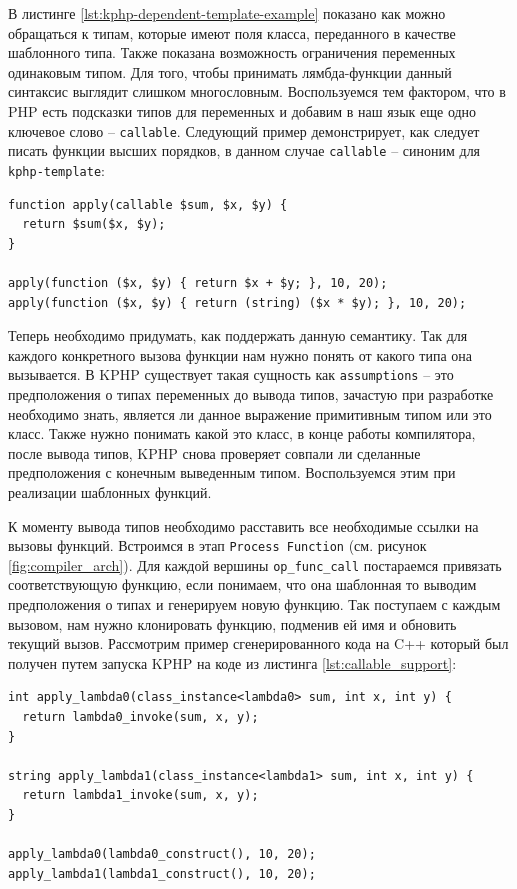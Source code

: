 В листинге \ref{lst:kphp-dependent-template-example} показано как можно обращаться к типам, которые имеют поля класса, переданного в качестве шаблонного типа.
Также показана возможность ограничения переменных одинаковым типом.
Для того, чтобы принимать лямбда-функции данный синтаксис выглядит слишком многословным.
Воспользуемся тем фактором, что в PHP есть подсказки типов для переменных и добавим в наш язык еще одно ключевое слово -- \verb|callable|.
Следующий пример демонстрирует, как следует писать функции высших порядков, в данном случае \verb|callable| -- синоним для \verb|kphp-template|:
\begin{lstlisting}[caption={Пример использования ключевого слова callable},label={lst:callable_support}]
function apply(callable $sum, $x, $y) {
  return $sum($x, $y);
}

apply(function ($x, $y) { return $x + $y; }, 10, 20);
apply(function ($x, $y) { return (string) ($x * $y); }, 10, 20);
\end{lstlisting}

Теперь необходимо придумать, как поддержать данную семантику.
Так для каждого конкретного вызова функции нам нужно понять от какого типа она вызывается.
В KPHP существует такая сущность как \verb|assumptions| -- это предположения о типах переменных до вывода типов, зачастую при разработке необходимо знать, является ли данное выражение примитивным типом или это класс.
Также нужно понимать какой это класс, в конце работы компилятора, после вывода типов, KPHP снова проверяет совпали ли сделанные предположения с конечным выведенным типом.
Воспользуемся этим при реализации шаблонных функций.

К моменту вывода типов необходимо расставить все необходимые ссылки на вызовы функций.
Встроимся в этап \verb|Process Function| (см. рисунок \ref{fig:compiler_arch}).
Для каждой вершины \verb|op_func_call| постараемся привязать соответствующую функцию, если понимаем, что она шаблонная то выводим предположения о типах и генерируем новую функцию.
Так поступаем с каждым вызовом, нам нужно клонировать функцию, подменив ей имя и обновить текущий вызов.
Рассмотрим пример сгенерированного кода на C++ который был получен путем запуска KPHP на коде из листинга \ref{lst:callable_support}:
\begin{lstlisting}
int apply_lambda0(class_instance<lambda0> sum, int x, int y) {
  return lambda0_invoke(sum, x, y);
}

string apply_lambda1(class_instance<lambda1> sum, int x, int y) {
  return lambda1_invoke(sum, x, y);
}

apply_lambda0(lambda0_construct(), 10, 20);
apply_lambda1(lambda1_construct(), 10, 20);
\end{lstlisting}

